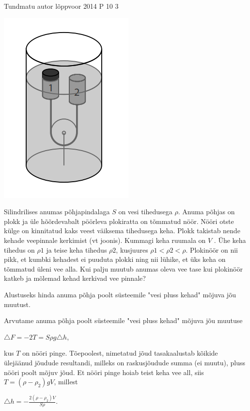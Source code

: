 {Tundmatu autor} %
{lõppvoor} %
{2014} %
{P 10} %
{3} %
{

\ifStatement
\begin{center}
	\includegraphics[width=0.5\linewidth]{2014-v3p-10-yl.PNG}
\end{center}
Silindrilises anumas põhjapindalaga $S$ on vesi tihedusega $\rho$. Anuma põhjas on plokk ja üle hõõrdevabalt pöörleva plokiratta on tõmmatud nöör. Nööri otste külge on kinnitatud kaks veest väiksema tihedusega keha. Plokk takistab nende kehade veepinnale kerkimist (vt joonis). Kummagi keha ruumala on $V$ . Ühe keha tihedus on $\rho 1$ ja teise keha tihedus $ \rho 2$, kusjuures $\rho1 < \rho2 < \rho$. Plokinöör on nii pikk, et kumbki kehadest ei puuduta plokki ning nii lühike, et üks keha on tõmmatud üleni vee alla. Kui palju muutub anumas oleva vee tase kui plokinöör katkeb ja mõlemad kehad kerkivad vee pinnale?
\fi

\ifHint
Alustuseks hinda anuma põhja poolt süsteemile "vesi pluss kehad" mõjuva jõu muutust. 
\fi

\ifSolution
Arvutame anuma põhja poolt süsteemile "vesi pluss kehad" mõjuva jõu muutuse
\begin{center}
$\triangle F = -2T = S \rho g \triangle h$,
\end{center}
kus $T$ on nööri pinge. Tõepoolest, nimetatud jõud tasakaalustab kõikide ülejäänud jõudude resultandi, milleks on raskusjõudude summa (ei muutu), pluss nööri poolt mõjuv jõud. Et nööri pinge hoiab teist keha vee all, siis $T = (\rho - \rho_2)gV$, millest
\begin{center}
$\triangle h = -\frac{2(\rho - \rho_2) V}{S \rho}$.
\end{center}
\fi
}